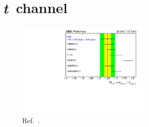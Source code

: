 \documentclass{PoS}
\begin{document}

\section{\textit{t}~channel}


\begin{figure}[!htb]
\begin{center}
\includegraphics[width=0.6\textwidth]{tch3.pdf}
\caption{\label{fig:t-channel-ratio}Ref.~\cite{tch}.}
\end{center}
\end{figure}
\end{document}
